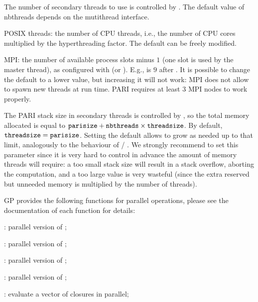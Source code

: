 The number of secondary threads to use is controlled by
. The default value of nbthreads depends on the
mutithread interface.

\item POSIX threads: the number of CPU threads, i.e., the number of CPU cores
multiplied by the hyperthreading factor. The default can be freely modified.

\item MPI: the number of available process slots minus $1$ (one slot is used by
the master thread), as configured with  (or ). E.g.,
 is $9$ after .
It is possible to change the default to a lower value, but increasing it will
not work: MPI does not allow to spawn new threads at run time. PARI requires
at least $3$ MPI nodes to work properly.

The PARI stack size in secondary threads is controlled by
, so the total memory allocated is equal to
${\tt parisize}+{\tt nbthreads}\times{\tt threadsize}$.  By default,
${\tt threadsize}={\tt parisize}$. Setting the  default
allows  to grow as needed up to that limit, analogously to
the behaviour of  / . We strongly recommend
to set this parameter since it is very hard to control in advance the amount
of memory threads will require: a too small stack size will result in a
stack overflow, aborting the computation, and a too large value is
very wasteful (since the extra reserved but unneeded memory is multiplied by
the number of threads).


GP provides the following functions for parallel operations, please
see the documentation of each function for details:

\item {}: parallel version of ;

\item {}:  parallel version of ;

\item {}:    parallel version of ;

\item {}:    parallel version of ;

\item {}:   evaluate a vector of closures in parallel;

